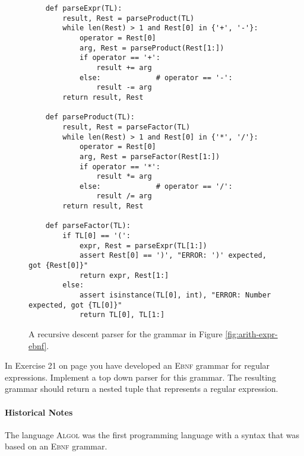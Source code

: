 \begin{figure}[!ht]
\centering
\begin{verbatim}
    def parseExpr(TL):
        result, Rest = parseProduct(TL)
        while len(Rest) > 1 and Rest[0] in {'+', '-'}: 
            operator = Rest[0]
            arg, Rest = parseProduct(Rest[1:])
            if operator == '+': 
                result += arg
            else:             # operator == '-': 
                result -= arg
        return result, Rest
    
    def parseProduct(TL):
        result, Rest = parseFactor(TL)
        while len(Rest) > 1 and Rest[0] in {'*', '/'}:
            operator = Rest[0]
            arg, Rest = parseFactor(Rest[1:])
            if operator == '*':
                result *= arg
            else:             # operator == '/':
                result /= arg
        return result, Rest
    
    def parseFactor(TL):
        if TL[0] == '(': 
            expr, Rest = parseExpr(TL[1:])
            assert Rest[0] == ')', "ERROR: ')' expected, got {Rest[0]}"
            return expr, Rest[1:]
        else:
            assert isinstance(TL[0], int), "ERROR: Number expected, got {TL[0]}"
            return TL[0], TL[1:]
\end{verbatim}
\vspace*{-0.3cm}
\caption{A recursive descent parser for the grammar in Figure \ref{fig:arith-expr-ebnf}.}
\label{fig:differentiate.stlx}
\end{figure}

\exerciseEng
In Exercise 21 on page \pageref{exercise:regexp} you have developed an \textsc{Ebnf} grammar for regular
expressions.  Implement a top down parser for this grammar.  The resulting grammar should return
a nested tuple that represents a regular expression.
\eox

\paragraph{Historical Notes} The language \textsc{Algol} \cite{backus:1959,naur:1960} was the first
programming language with a syntax that was based on an \textsc{Ebnf} grammar.  



